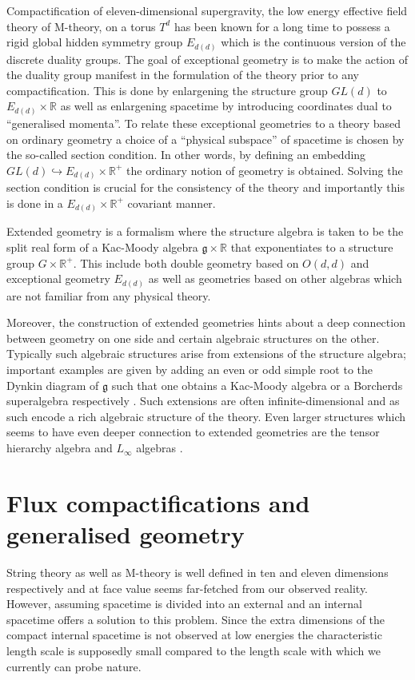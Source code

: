 Compactification of eleven-dimensional supergravity, the low energy effective field theory of M-theory, on a torus $T^d$ has been known for a long time to possess a rigid global hidden symmetry group $E_{d(d)}$\cite{CREMMER197848,Cremmer:1979up,Cremmer:1997ct} which is the continuous version of the discrete duality groups. The goal of exceptional geometry is to make the action of the duality group manifest in the formulation of the theory prior to any compactification. This is done by enlargening the structure group $GL(d)$ to $E_{d(d)}\times\mathbb{R}$ as well as enlargening spacetime by introducing coordinates dual to ``generalised momenta''. To relate these exceptional geometries to a theory based on ordinary geometry a choice of a ``physical subspace'' of spacetime is chosen by the so-called section condition. In other words, by defining an embedding $GL(d)\hookrightarrow E_{d(d)}\times\mathbb{R}^+$ the ordinary notion of geometry is obtained. Solving the section condition is crucial for the consistency of the theory and importantly this is done in a $E_{d(d)}\times\mathbb{R}^+$ covariant manner. 

Extended geometry \cite{CederwallPalmkvist2017} is a formalism where the structure algebra is taken to be the split real form of a Kac-Moody algebra $\mathfrak{g}\times\mathbb{R}$ that exponentiates to a structure group $G\times \mathbb{R}^+$. This include both double geometry based on $O(d,d)$ and exceptional geometry $E_{d(d)}$ as well as geometries based on other algebras which are not familiar from any physical theory. 

Moreover, the construction of extended geometries hints about a deep connection between geometry on one side and certain algebraic structures on the other. Typically such algebraic structures arise from extensions of the structure algebra; important examples are given by adding an even or odd simple root to the Dynkin diagram of $\mathfrak{g}$ such that one obtains a Kac-Moody algebra or a Borcherds superalgebra respectively \cite{Palmkvist2015ExpGeomSuperAlg,CederwallPalmkvistSuperalgebras2015}. Such extensions are often infinite-dimensional and as such encode a rich algebraic structure of the theory. Even larger structures which seems to have even deeper connection to extended geometries are the tensor hierarchy algebra \cite{Palmkvist:2013vya,Carbone:2018njd} and $L_\infty$ algebras \cite{Cederwall:2018aab,Hohm:2017pnh}.


\section{Flux compactifications and generalised geometry}
String theory as well as M-theory is well defined in ten and eleven dimensions respectively and at face value seems far-fetched from our observed reality. However, assuming spacetime is divided into an external and an internal spacetime offers a solution to this problem. Since the extra dimensions of the compact internal spacetime is not observed at low energies the characteristic length scale is supposedly small compared to the length scale with which we currently can probe nature.

